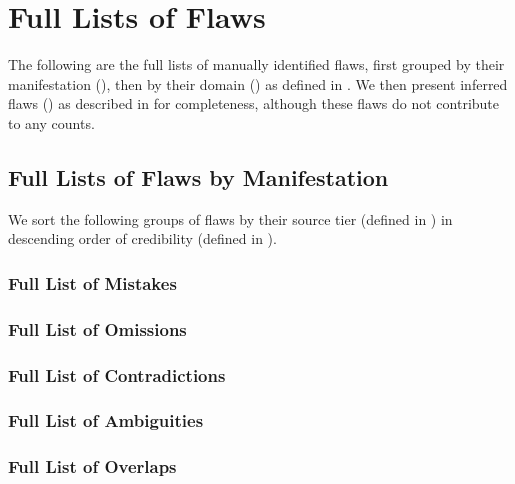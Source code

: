 \chapter{Full Lists of Flaws}\label{flaws-full}

The following are the full lists of manually identified flaws, first grouped
by their manifestation (), then by their domain
() as defined in . We then present inferred
flaws () as described in  for completeness,
although these flaws do not contribute to any counts.

\section{Full Lists of Flaws by Manifestation}\label{flawMnfsts-full}

We sort the following groups of flaws by their source tier (defined in
) in descending order of credibility (defined in
).

\subsection{Full List of Mistakes}\label{wrong-full}


\subsection{Full List of Omissions}\label{miss-full}


\subsection{Full List of Contradictions}\label{contra-full}


\subsection{Full List of Ambiguities}\label{ambi-full}


\subsection{Full List of Overlaps}\label{over-full}


